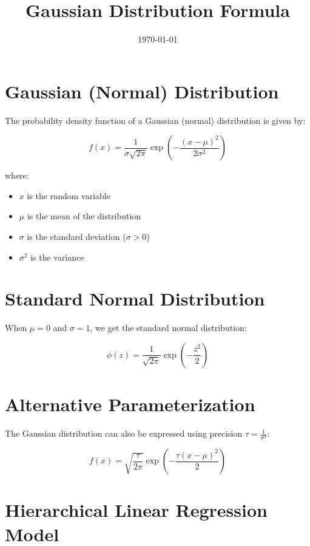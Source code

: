\documentclass[12pt]{article}
\title{Gaussian Distribution Formula}
\author{}
\date{\today}
\begin{document}
\maketitle

\section{Gaussian (Normal) Distribution}

The probability density function of a Gaussian (normal) distribution is given by:

\begin{equation}
f(x) = \frac{1}{\sigma\sqrt{2\pi}} \exp\left(-\frac{(x-\mu)^2}{2\sigma^2}\right)
\end{equation}

where:
\begin{itemize}
    \item $x$ is the random variable
    \item $\mu$ is the mean of the distribution
    \item $\sigma$ is the standard deviation ($\sigma > 0$)
    \item $\sigma^2$ is the variance
\end{itemize}

\section{Standard Normal Distribution}

When $\mu = 0$ and $\sigma = 1$, we get the standard normal distribution:

\begin{equation}
\phi(z) = \frac{1}{\sqrt{2\pi}} \exp\left(-\frac{z^2}{2}\right)
\end{equation}

\section{Alternative Parameterization}

The Gaussian distribution can also be expressed using precision $\tau = \frac{1}{\sigma^2}$:

\begin{equation}
f(x) = \sqrt{\frac{\tau}{2\pi}} \exp\left(-\frac{\tau(x-\mu)^2}{2}\right)
\end{equation}

\section{Hierarchical Linear Regression Model}
\end{document}
